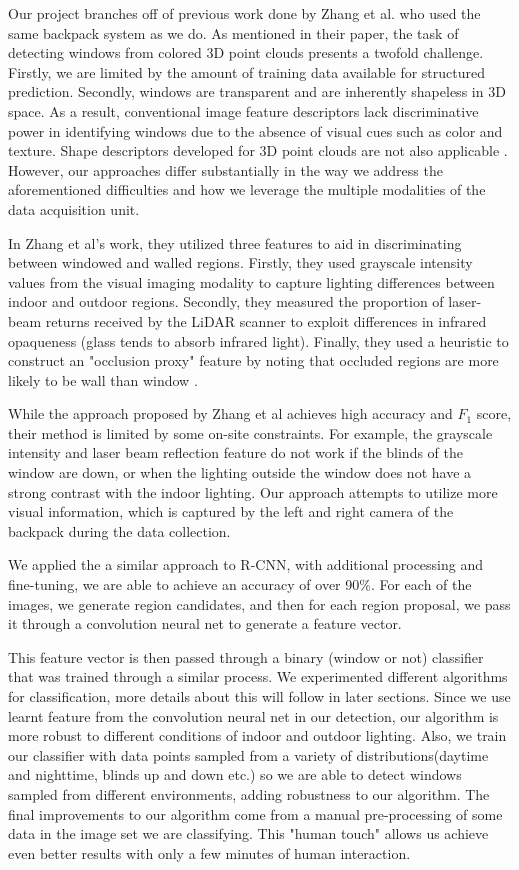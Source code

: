 \documentclass[10pt,twocolumn,letterpaper]{article}
\begin{document}
Our project branches off of previous work done by Zhang et al. \cite{rzhang} who used the same backpack system as we do. As mentioned in their paper, the task of detecting windows from colored 3D point clouds presents a twofold challenge. Firstly, we are limited by the amount of training data available for structured prediction. Secondly, windows are transparent and are inherently shapeless in 3D space. As a result, conventional image feature descriptors lack discriminative power in identifying windows due to the absence of visual cues such as color and texture. Shape descriptors developed for 3D point clouds are not also applicable \cite{rzhang}. However, our approaches differ substantially in the way we address the aforementioned difficulties and how we leverage the multiple modalities of the data acquisition unit.

In Zhang et al's work, they utilized three features to aid in discriminating between windowed and walled regions. Firstly, they used grayscale intensity values from the visual imaging modality to capture lighting differences between indoor and outdoor regions. Secondly, they measured the proportion of laser-beam returns received by the LiDAR scanner to exploit differences in infrared opaqueness (glass tends to absorb infrared light). Finally, they used a heuristic to construct an "occlusion proxy" feature by noting that occluded regions are more likely to be wall than window \cite{rzhang}.

While the approach proposed by Zhang et al achieves high accuracy and $F_1$ score, their method is limited by some on-site constraints. For example, the grayscale intensity and laser beam reflection feature do not work if the blinds of the window are down, or when the lighting outside the window does not have a strong contrast with the indoor lighting. Our approach attempts to utilize more visual information, which is captured by the left and right camera of the backpack during the data collection. 

We applied the a similar approach to R-CNN\cite{girshick}, with additional processing and fine-tuning, we are able to achieve an accuracy of over 90\%. For each of the images, we generate region candidates, and then for each region proposal, we pass it through a convolution neural net to generate a feature vector. 

This feature vector is then passed through a binary (window or not) classifier that was trained through a similar process. We experimented different algorithms for classification, more details about this will follow in later sections. Since we use learnt feature from the convolution neural net in our detection, our algorithm is more robust to different conditions of indoor and outdoor lighting. Also, we train our classifier with data points sampled from a variety of distributions(daytime and nighttime, blinds up and down etc.) so we are able to detect windows sampled from different environments, adding robustness to our algorithm. The final improvements to our algorithm come from a manual pre-processing of some data in the image set we are classifying. This "human touch" allows us achieve even better results with only a few minutes of human interaction.
\end{document}
